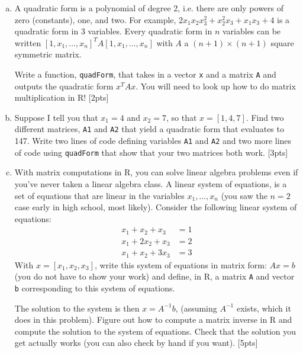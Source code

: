 \documentclass[12pt]{article}
\begin{document}
\begin{enumerate}[(a)]
	\item A quadratic form is a polynomial of degree 2, i.e. there are only powers of zero (constants), one, and two. For example, $2x_1x_2x_3^2 + x_2^2x_3 + x_1x_3 + 4$ is a quadratic form in 3 variables. Every quadratic form in $n$ variables can be written $[1,x_1,\ldots,x_n]^T A [1,x_1,\ldots,x_n]$ with $A$ a $(n+1) \times (n+1)$ square symmetric matrix.
	
	Write a function, \verb|quadForm|, that takes in a vector \verb|x| and a matrix \verb|A| and outputs the quadratic form $x^T A x$. You will need to look up how to do matrix multiplication in R! [2pts]
	\item Suppose I tell you that $x_1 = 4$ and $x_2 = 7$, so that $x = [1,4,7]$. Find two different matrices, \verb|A1| and \verb|A2| that yield a quadratic form that evaluates to 147. Write two lines of code defining variables \verb|A1| and \verb|A2| and two more lines of code using \verb|quadForm| that show that your two matrices both work. [3pts]
	\item With matrix computations in R, you can solve linear algebra problems even if you've never taken a linear algebra class. A linear system of equations, is a set of equations that are linear in the variables $x_1,\ldots,x_n$ (you saw the $n=2$ case early in high school, most likely). Consider the following linear system of equations:
	\begin{align*}
	x_1 + x_2 + x_3 &= 1 \\
	x_1 + 2x_2 + x_3 &= 2 \\
	x_1 + x_2 + 3x_3 &= 3
	\end{align*}
	With $x = [x_1,x_2,x_3]$, write this system of equations in matrix form: $Ax = b$ (you do not have to show your work) and define, in R, a matrix \verb|A| and vector \verb|b| corresponding to this system of equations.
	
	The solution to the system is then $x = A^{-1}b$, (assuming $A^{-1}$ exists, which it does in this problem). Figure out how to compute a matrix inverse in R and compute the solution to the system of equations. Check that the solution you get actually works (you can also check by hand if you want). [5pts]
\end{enumerate}
\end{document}
